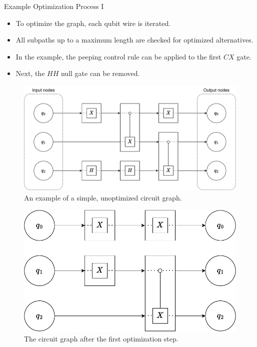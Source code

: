 \begin{frame}{Example Optimization Process I}
    \begin{itemize}
        \item To optimize the graph, each qubit wire is iterated.
        \item All subpaths up to a maximum length are checked for optimized alternatives.
        \item In the example, the peeping control rule can be applied to the first $CX$ gate.
        \item Next, the $HH$ null gate can be removed. 
    \end{itemize}
    \vfill
    \begin{minipage}{.55\textwidth}
        \begin{figure}[htp]
            \centering     
            \includegraphics[width=.9\textwidth]{../figures/drawio/circuit_graph_unoptimized.pdf}
            \caption{An example of a simple, unoptimized circuit graph.}
        \end{figure}
    \end{minipage}
    \begin{minipage}{.40\textwidth}
        \begin{figure}[htp]
            \centering     
            \includegraphics[width=\textwidth]{../figures/drawio/circuit_graph_optimized_firststep.pdf}
            \caption{The circuit graph after the first optimization step.}
        \end{figure}
    \end{minipage}
\end{frame}

